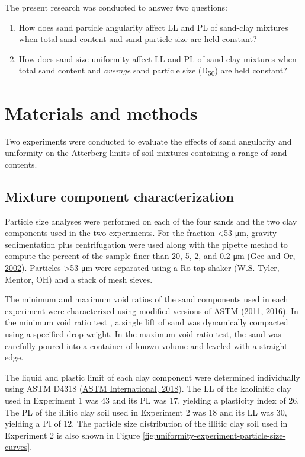 \documentclass[
  letterpaper,
]{article}
\begin{document}
The present research was conducted to answer two questions:

\begin{enumerate}
\def\labelenumi{\arabic{enumi}.}
\item
  How does sand particle angularity affect LL and PL of sand-clay mixtures when total sand content and sand particle size are held constant?
\item
  How does sand-size uniformity affect LL and PL of sand-clay mixtures when total sand content and \emph{average} sand particle size (D\textsubscript{50}) are held constant?
\end{enumerate}

\hypertarget{materials-and-methods}{%
\section{Materials and methods}\label{materials-and-methods}}

Two experiments were conducted to evaluate the effects of sand angularity and uniformity on the Atterberg limits of soil mixtures containing a range of sand contents.

\hypertarget{mixture-component-characterization}{%
\subsection{Mixture component characterization}\label{mixture-component-characterization}}

Particle size analyses were performed on each of the four sands and the two clay components used in the two experiments.
For the fraction \textless53 μm, gravity sedimentation plus centrifugation were used along with the pipette method to compute the percent of the sample finer than 20, 5, 2, and 0.2 μm (\protect\hyperlink{ref-Gee2002}{Gee and Or, 2002}).
Particles \textgreater53 μm were separated using a Ro-tap shaker (W.S. Tyler, Mentor, OH) and a stack of mesh sieves.

The minimum and maximum void ratios of the sand components used in each experiment were characterized using modified versions of ASTM (\protect\hyperlink{ref-ASTMF1815-11}{2011}, \protect\hyperlink{ref-ASTMInternational2016}{2016}).
In the minimum void ratio test , a single lift of sand was dynamically compacted using a specified drop weight.
In the maximum void ratio test, the sand was carefully poured into a container of known volume and leveled with a straight edge.

The liquid and plastic limit of each clay component were determined individually using ASTM D4318 (\protect\hyperlink{ref-ASTMD43182018}{ASTM International, 2018}).
The LL of the kaolinitic clay used in Experiment 1 was 43 and its PL was 17, yielding a plasticity index of 26.
The PL of the illitic clay soil used in Experiment 2 was 18 and its LL was 30, yielding a PI of 12.
The particle size distribution of the illitic clay soil used in Experiment 2 is also shown in Figure \ref{fig:uniformity-experiment-particle-size-curves}.
\end{document}
